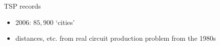 \begin{frame}{TSP records}
\begin{itemize}
\item 2006: $85,900$ `cities'
\item distances, etc. from real circuit production problem from the 1980s
\end{itemize}
\end{frame}
